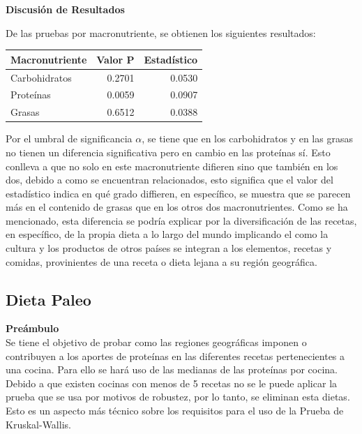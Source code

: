 \documentclass[12pt,a4paper]{article}
\begin{document}
        \textbf{Discusión de Resultados}\\
        {
            De las pruebas por macronutriente, se obtienen los siguientes resultados:

            \begin{center}
                \begin{tabular}{lrr}
                    \toprule
                        \textbf{Macronutriente} & \textbf{Valor P} & \textbf{Estadístico} \\
                    \midrule
                        Carbohidratos & 0.2701 & 0.0530 \\
                        Proteínas     & 0.0059 & 0.0907 \\
                        Grasas        & 0.6512 & 0.0388 \\
                    \bottomrule
                \end{tabular}
            \end{center}

            Por el umbral de significancia $\alpha$, se tiene que en los carbohidratos y en las 
            grasas no tienen un diferencia significativa pero en cambio en las proteínas sí. Esto 
            conlleva a que no solo en este macronutriente difieren sino que también en los dos, debido 
            a como se encuentran relacionados, esto significa que el valor del estadístico indica en qué 
            grado diffieren, en específico, se muestra que se parecen más en el contenido de grasas que en 
            los otros dos macronutrientes. 
            Como se ha mencionado, esta diferencia se podría explicar por la diversificación de las recetas, 
            en específico, de la propia dieta a lo largo del mundo implicando el como la cultura y los productos 
            de otros países se integran a los elementos, recetas y comidas, provinientes de una receta o dieta lejana 
            a su región geográfica.
        }

    \subsection{Dieta Paleo}
        \textbf{Preámbulo}\\
        {
            Se tiene el objetivo de probar como las regiones geográficas imponen o contribuyen 
            a los aportes de proteínas en las diferentes recetas pertenecientes a una cocina. Para 
            ello se hará uso de las medianas de las proteínas por cocina. 
            Debido a que existen cocinas con menos de 5 recetas no se le puede aplicar la 
            prueba que se usa por motivos de robustez, por lo tanto, se eliminan esta dietas. Esto 
            es un aspecto más técnico sobre los requisitos para el uso de la Prueba de Kruskal-Wallis.\\
        }
\end{document}
